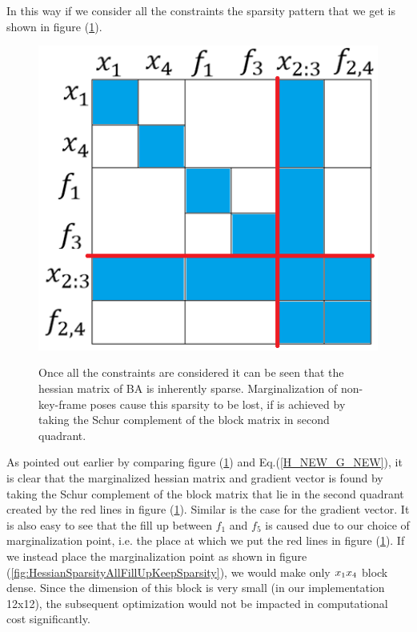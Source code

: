 In this way if we consider all the constraints the sparsity pattern that we get is shown in figure (\ref{fig:HessianSparsityAllFillUp}).

\begin{figure}[ht]
	\centering
		\includegraphics[width=1.00\textwidth]{images/HessianSparsityAllFillUp.png}
	\label{fig:HessianSparsityAllFillUp}
  \caption{Once all the constraints are considered it can be seen that the hessian matrix of BA is inherently sparse. Marginalization of non-key-frame poses cause this sparsity to be lost, if is achieved by taking the Schur complement of the block matrix in second quadrant.}
\end{figure}

As pointed out earlier by comparing figure (\ref{fig:HessianSparsityAllFillUp}) and Eq.(\ref{H_NEW_G_NEW}), it is clear that the marginalized hessian matrix and gradient vector is found by taking the Schur complement of the block matrix that lie in the second quadrant created by the red lines in figure (\ref{fig:HessianSparsityAllFillUp}). Similar is the case for the gradient vector. It is also easy to see that the fill up between $f_1$ and $f_5$ is caused due to our choice of marginalization point, i.e. the place at which we put the red lines in figure (\ref{fig:HessianSparsityAllFillUp}). If we instead place the marginalization point as shown in figure (\ref{fig:HessianSparsityAllFillUpKeepSparsity}), we would make only $x_1\-x_4$ block dense. Since the dimension of this block is very small (in our implementation 12x12), the subsequent optimization would not be impacted in computational cost significantly.

